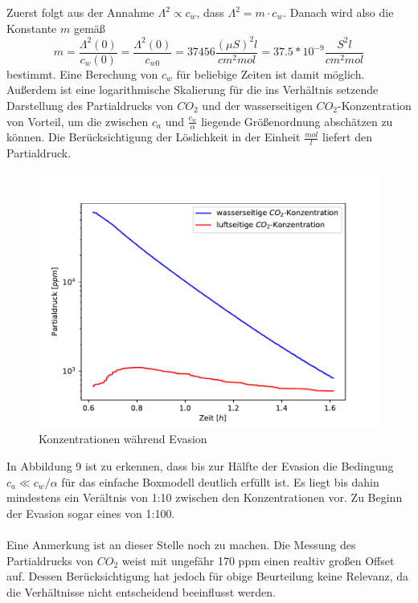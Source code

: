 \documentclass[12pt]{article}
\begin{document}
Zuerst folgt aus der Annahme $\Lambda ^2 \propto c_w $, dass $\Lambda ^2 = m \cdot c_w $. Danach wird also die Konstante $m$ gemäß
\begin{equation}
m = \frac{\Lambda^2(0)}{c_w(0)} = \frac{\Lambda^2(0)}{c_{w0}} = 37456 \frac{(\mu S)^2 l}{cm^2 mol} = 37.5 * 10^{-9} \frac{S^2 l}{cm^2 mol}
\end{equation}
bestimmt. Eine Berechung von $c_w$ für beliebige Zeiten ist damit möglich. Außerdem ist eine logarithmische Skalierung für die ins Verhältnis setzende Darstellung des Partialdrucks von $CO_2$ und der wasserseitigen $CO_2$-Konzentration von Vorteil, um die zwischen $c_a$ und $\frac{c_w}{\alpha}$ liegende Größenordnung abschätzen zu können.
Die Berücksichtigung der Löslichkeit in der Einheit $\frac{mol}{l}$ liefert den Partialdruck.

\begin{figure}[H]
	\centering
	\includegraphics[width=120mm]{VE-Wasser/LeitfaehigkeitQuadrat.pdf}
	\caption{Konzentrationen während Evasion}
\end{figure}

In Abbildung 9 ist zu erkennen, dass bis zur Hälfte der Evasion die Bedingung $c_a \ll c_w/\alpha $ für das einfache Boxmodell deutlich erfüllt ist. Es liegt bis dahin
mindestens ein Verältnis von 1:10 zwischen den Konzentrationen vor. Zu Beginn der Evasion sogar eines von 1:100. \\\\
Eine Anmerkung ist an dieser Stelle noch zu machen. Die Messung des Partialdrucks von $CO_2$ weist mit ungefähr 170 ppm einen realtiv großen Offset auf.
Dessen Berücksichtigung hat jedoch für obige Beurteilung keine Relevanz, da die Verhältnisse nicht entscheidend beeinflusst werden.
\end{document}
